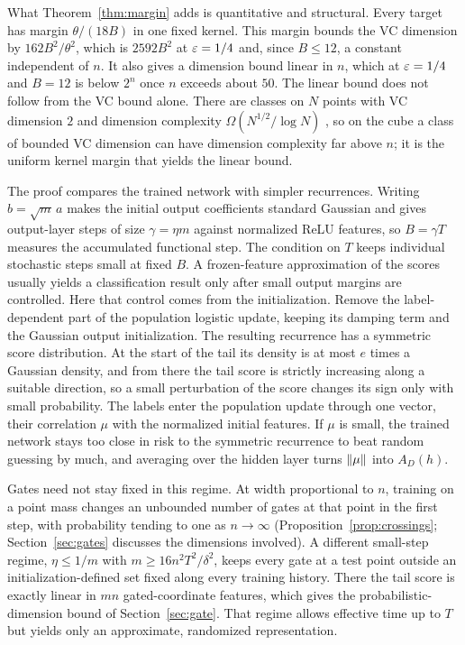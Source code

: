 \documentclass[11pt,letterpaper,pmlr,twoside]{jmlr}
\begin{document}
What Theorem~\ref{thm:margin} adds is quantitative and structural. Every target has margin $\theta/(18B)$ in one fixed kernel. This margin bounds the VC dimension by $162B^2/\theta^2$, which is $2592B^2$ at $\varepsilon=1/4$ and, since $B\le12$, a constant independent of $n$. It also gives a dimension bound linear in $n$, which at $\varepsilon=1/4$ and $B=12$ is below $2^n$ once $n$ exceeds about $50$. The linear bound does not follow from the VC bound alone. There are classes on $N$ points with VC dimension $2$ and dimension complexity $\Omega(N^{1/2}/\log N)$ \citep[Theorem~2]{AMY16}, so on the cube a class of bounded VC dimension can have dimension complexity far above $n$; it is the uniform kernel margin that yields the linear bound.

The proof compares the trained network with simpler recurrences. Writing $b=\sqrt m\,a$ makes the initial output coefficients standard Gaussian and gives output-layer steps of size $\gamma=\eta m$ against normalized ReLU features, so $B=\gamma T$ measures the accumulated functional step. The condition on $T$ keeps individual stochastic steps small at fixed $B$. A frozen-feature approximation of the scores usually yields a classification result only after small output margins are controlled. Here that control comes from the initialization. Remove the label-dependent part of the population logistic update, keeping its damping term and the Gaussian output initialization. The resulting recurrence has a symmetric score distribution. At the start of the tail its density is at most $e$ times a Gaussian density, and from there the tail score is strictly increasing along a suitable direction, so a small perturbation of the score changes its sign only with small probability. The labels enter the population update through one vector, their correlation $\mu$ with the normalized initial features. If $\mu$ is small, the trained network stays too close in risk to the symmetric recurrence to beat random guessing by much, and averaging over the hidden layer turns $\lVert \mu\rVert$ into $A_D(h)$.

Gates need not stay fixed in this regime. At width proportional to $n$, training on a point mass changes an unbounded number of gates at that point in the first step, with probability tending to one as $n\to\infty$ (Proposition~\ref{prop:crossings}; Section~\ref{sec:gates} discusses the dimensions involved). A different small-step regime, $\eta\le1/m$ with $m\ge16n^2T^2/\delta^2$, keeps every gate at a test point outside an initialization-defined set fixed along every training history. There the tail score is exactly linear in $mn$ gated-coordinate features, which gives the probabilistic-dimension bound of Section~\ref{sec:gate}. That regime allows effective time up to $T$ but yields only an approximate, randomized representation.
\end{document}
